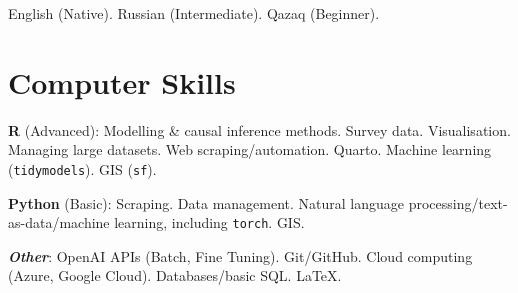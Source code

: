 \documentclass[10pt, a4paper]{article}
\begin{document}
English (Native). Russian (Intermediate). Qazaq (Beginner).

\section{Computer Skills}

\textbf{R} (Advanced): Modelling \& causal inference methods. Survey data. Visualisation. Managing large datasets. Web scraping/automation. Quarto. Machine learning (\texttt{tidymodels}). GIS (\texttt{sf}).

\textbf{Python} (Basic): Scraping. Data management. Natural language processing/\allowbreak text-as-data/\allowbreak machine learning, including \texttt{torch}. GIS.

\textbf{\textit{Other}}: OpenAI APIs (Batch, Fine Tuning). Git/GitHub. Cloud computing (Azure, Google Cloud). Databases/\allowbreak basic SQL. \LaTeX.
\end{document}

